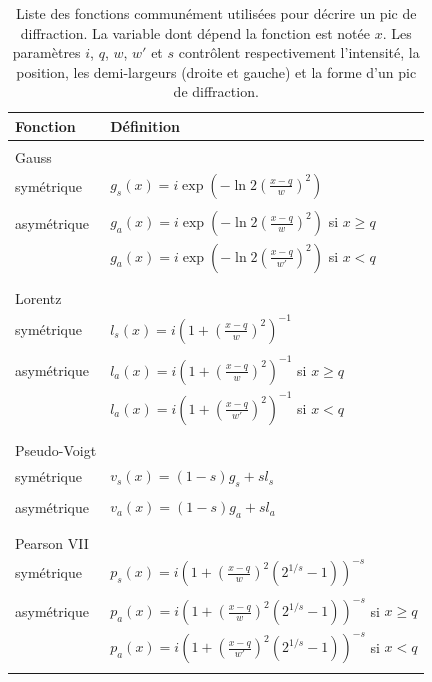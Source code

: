 \documentclass[french,a4paper]{report}
\begin{document}
\begin{table}
\centering
\begin{tabular}{ll}
\hline
Fonction & Définition \\
\hline
& \\
Gauss & \\
\quad symétrique & $g_s (x)=i \exp \left( - \ln 2 \left( \frac{x-q}{w}\right)^2\right)$ \\
& \\
\quad asymétrique & $g_a(x)=i \exp \left( - \ln 2 \left( \frac{x-q}{w}\right)^2\right)$ si $x \geq q$ \\
& $g_a(x)=i \exp \left( - \ln 2 \left( \frac{x-q}{w'}\right)^2\right)$ si $x < q$ \\
& \\
\hline
& \\
Lorentz & \\
\quad symétrique & $l_s(x)= i \left(   1+ \left(\frac{x-q}{w}\right)^2\right)^{-1}$ \\
& \\
\quad asymétrique & $l_a(x)= i \left(   1+ \left(\frac{x-q}{w}\right)^2\right)^{-1}$ si $x \geq q$ \\
& $l_a(x)= i \left(  1+ \left(\frac{x-q}{w'}\right)^2\right)^{-1}$ si $x < q$ \\
& \\
\hline
& \\
Pseudo-Voigt & \\
\quad symétrique & $v_s(x)=(1 -s) g_s+ s l_s$ \\
& \\
\quad asymétrique & $v_a(x)=(1 -s) g_a+ s l_a$  \\
& \\
\hline
& \\
Pearson VII & \\
\quad symétrique & $p_s(x)=i \left(   1+ \left(\frac{x-q}{w}\right)^2 \left( 2^{1/s}-1\right)\right)^{-s}$  \\
& \\
\quad asymétrique & $p_a (x) =i \left(   1+ \left(\frac{x-q}{w}\right)^2 \left( 2^{1/s}-1\right)\right)^{-s}$ si $x \geq q$  \\
 & $p_a(x)=i \left(   1+ \left(\frac{x-q}{w'}\right)^2 \left( 2^{1/s}-1\right)\right)^{-s}$ si $x <q$  \\
 & \\
\hline
\end{tabular}
\caption{Liste des fonctions communément utilisées pour décrire un pic de diffraction. La variable dont dépend la fonction est notée $x$. Les paramètres $i$, $q$, $w$, $w'$ et $s$ contrôlent respectivement l'intensité, la position, les demi-largeurs (droite et gauche) et la forme d'un pic de diffraction.}
\label{tab_fonction}
\end{table}
\end{document}
